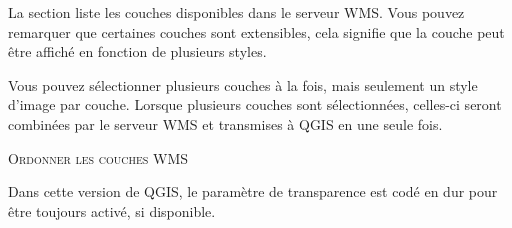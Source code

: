 
La section  liste les couches disponibles dans le serveur WMS. Vous
pouvez remarquer que certaines couches sont extensibles, cela signifie que la
couche peut \^etre affich\'e en fonction de plusieurs styles.

Vous pouvez s\'electionner plusieurs couches \`a la fois, mais seulement un style 
d'image par couche. Lorsque plusieurs couches sont s\'electionn\'ees, celles-ci 
seront combin\'ees par le serveur WMS et transmises \`a QGIS en une seule fois.

\begin{Tip}[ht]\caption{\textsc{Ordonner les couches WMS}}
\end{Tip}

\label{ogc-wms-transparency}

Dans cette version de QGIS, le param\`etre de transparence est cod\'e en dur pour 
\^etre toujours activ\'e, si disponible.

